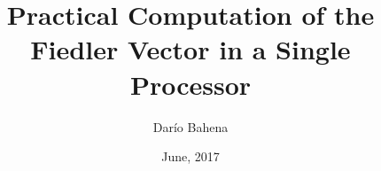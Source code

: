 \documentclass[unknownkeysallowed]{beamer}
\title{Practical Computation of the Fiedler Vector in a Single Processor}
\author{Darío Bahena}
\institute{CINVESTAV}
\date{June, 2017}
\begin{document}
	\begin{frame}[plain]
	  \titlepage
	\end{frame}
  
  
  
  
  
  
  
  
    
  
  
    
  
  
    
\end{document}
